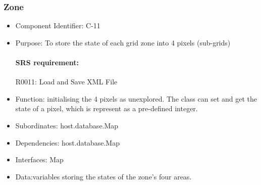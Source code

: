 \documentclass[11pt, a4paper]{report}
\begin{document}
\subsubsection{Zone}
\begin{itemize}
\item Component Identifier: C-11
\item Purpose: To store the state of each grid zone into 4 pixels (sub-grids)
\paragraph{SRS requirement:} R0011: Load and Save XML File
\item Function: initialising the 4 pixels as unexplored. The class can set and get the state
of a pixel, which is represent as a pre-defined integer.
\item Subordinates: host.database.Map
\item Dependencies: host.database.Map
\item Interfaces: Map
\item Data:variables storing the states of the zone's four areas.
\end{itemize}

\end{document}
